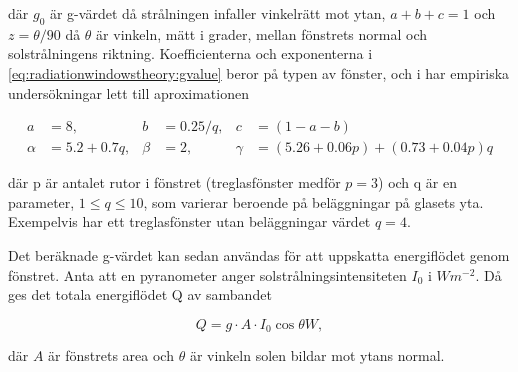 där $g_0$ är g-värdet då strålningen infaller vinkelrätt mot ytan, $a+b+c=1$ och $z=\theta/90$ då $\theta$ är vinkeln, mätt i grader, mellan fönstrets normal och solstrålningens riktning. Koefficienterna och exponenterna i \eqref{eq:radiationwindowstheory:gvalue} beror på typen av fönster, och i \cite{karlssonroos99} har empiriska undersökningar lett till aproximationen

\begin{align}\label{eq:gconstants}
a & = 8, & b & = 0.25/q, & c & = (1-a-b) \nonumber \\
\alpha & = 5.2 + 0.7q, & \beta & = 2, & \gamma & = (5.26+0.06p) + (0.73+0.04p)q
\end{align}

där p är antalet rutor i fönstret (treglasfönster medför $p = 3$) och q är en parameter, $1 \le q \le 10$, som varierar beroende på beläggningar på glasets yta. Exempelvis har ett treglasfönster utan beläggningar värdet $q=4$.

Det beräknade g-värdet kan sedan användas för att uppskatta energiflödet genom fönstret. Anta att en pyranometer anger solstrålningsintensiteten $I_0$ i $\unit{W m^{-2}}$. Då ges det totala energiflödet Q av sambandet 

\begin{equation}\label{eq:totalsun}
Q = g \cdot A \cdot I_0 \cos{\theta} \unit{W},
\end{equation}

där $A$ är fönstrets area och $\theta$ är vinkeln solen bildar mot ytans normal.
